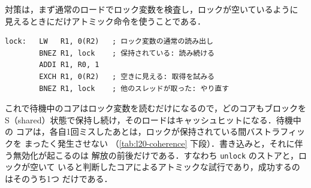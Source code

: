 \documentclass[../main.tex]{subfiles}
\begin{document}
対策は，まず通常のロードでロック変数を検査し，ロックが空いているように
見えるときにだけアトミック命令を使うことである．
\begin{lstlisting}[language={[x86masm]Assembler}, numbers=none, deletekeywords={lock}]
lock:   LW   R1, 0(R2)   ; ロック変数の通常の読み出し
        BNEZ R1, lock    ; 保持されている: 読み続ける
        ADDI R1, R0, 1
        EXCH R1, 0(R2)   ; 空きに見える: 取得を試みる
        BNEZ R1, lock    ; 他のスレッドが取った: やり直す
\end{lstlisting}
これで待機中のコアはロック変数を読むだけになるので，どのコアもブロックを
S（shared）状態で保持し続け，そのロードはキャッシュヒットになる．待機中の
コアは，各自1回ミスしたあとは，ロックが保持されている間バストラフィックを
まったく発生させない
（\cref{tab:l20-coherence} 下段）．書き込みと，それに伴う無効化が起こるのは
解放の前後だけである．すなわち \texttt{unlock} のストアと，ロックが空いて
いると判断したコアによるアトミックな試行であり，成功するのはそのうち1つ
だけである．
\end{document}

